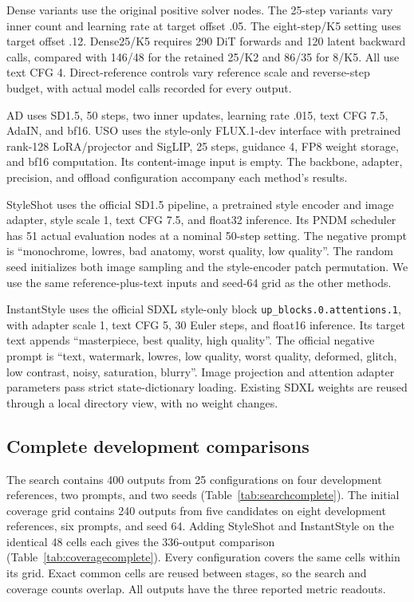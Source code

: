 Dense variants use the original positive solver nodes. The 25-step
variants vary inner count and learning rate at target offset .05. The
eight-step/K5 setting uses target offset .12. Dense25/K5 requires 290 DiT
forwards and 120 latent backward calls, compared with 146/48 for the
retained 25/K2 and 86/35 for 8/K5. All use text CFG 4. Direct-reference
controls vary reference scale and reverse-step budget, with actual model
calls recorded for every output.

AD uses SD1.5, 50 steps, two inner updates, learning rate .015, text CFG
7.5, AdaIN, and bf16. USO uses the style-only FLUX.1-dev interface with
pretrained rank-128 LoRA/projector and SigLIP, 25 steps, guidance 4, FP8
weight storage, and bf16 computation. Its content-image input is empty.
The backbone, adapter, precision, and offload configuration accompany each
method's results.

StyleShot uses the official SD1.5 pipeline, a pretrained style encoder and
image adapter, style scale 1, text CFG 7.5, and float32 inference. Its PNDM
scheduler has 51 actual evaluation nodes at a nominal 50-step setting.
The negative prompt is ``monochrome, lowres, bad anatomy, worst quality, low
quality''. The random seed initializes both image sampling and the
style-encoder patch permutation. We use the same reference-plus-text inputs
and seed-64 grid as the other methods.

InstantStyle uses the official SDXL style-only block
\texttt{up\_blocks.0.attentions.1}, with adapter scale 1, text CFG 5,
30 Euler steps, and float16 inference. Its target text appends
``masterpiece, best quality, high quality''. The official negative prompt
is ``text, watermark, lowres, low quality, worst quality, deformed, glitch,
low contrast, noisy, saturation, blurry''. Image projection and attention
adapter parameters pass strict state-dictionary loading. Existing SDXL
weights are reused through a local directory view, with no weight changes.

\subsection{Complete development comparisons}
The search contains 400 outputs from 25 configurations on four development
references, two prompts, and two seeds (Table~\ref{tab:searchcomplete}).
The initial coverage grid contains 240 outputs from five candidates on
eight development references, six prompts, and seed 64. Adding StyleShot
and InstantStyle on the identical 48 cells each gives the 336-output comparison
(Table~\ref{tab:coveragecomplete}). Every configuration covers the same
cells within its grid. Exact common cells are reused between stages, so
the search and coverage counts overlap. All outputs have the three
reported metric readouts.

